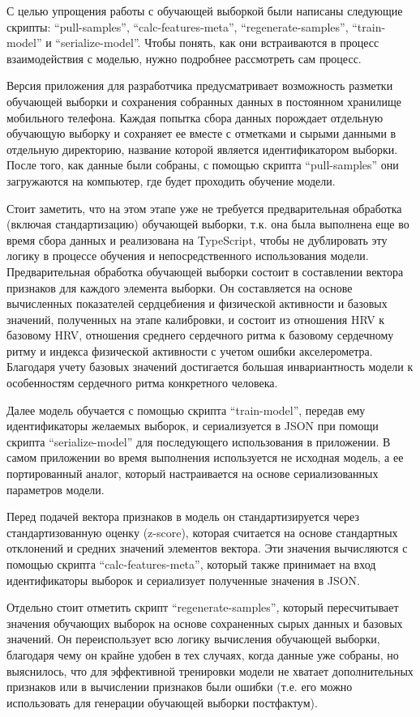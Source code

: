 \documentclass[14pt]{matmex-diploma-custom}
\begin{document}
С целью упрощения работы с обучающей выборкой были написаны следующие скрипты:
``pull-samples'', ``calc-features-meta'', ``regenerate-samples'',
``train-model'' и ``serialize-model''. Чтобы понять, как они встраиваются в
процесс взаимодействия с моделью, нужно подробнее рассмотреть сам процесс.

Версия приложения для разработчика предусматривает возможность разметки
обучающей выборки и сохранения собранных данных в постоянном хранилище
мобильного телефона. Каждая попытка сбора данных порождает отдельную обучающую
выборку и сохраняет ее вместе с отметками и сырыми данными в отдельную
директорию, название которой является идентификатором выборки. После того, как
данные были собраны, с помощью скрипта ``pull-samples'' они загружаются на
компьютер, где будет проходить обучение модели.

Стоит заметить, что на этом этапе уже не требуется предварительная обработка
(включая стандартизацию) обучающей выборки, т.к. она была выполнена еще во время
сбора данных и реализована на TypeScript, чтобы не дублировать эту логику в
процессе обучения и непосредственного использования модели. Предварительная
обработка обучающей выборки состоит в составлении вектора признаков для каждого
элемента выборки. Он составляется на основе вычисленных показателей сердцебиения
и физической активности и базовых значений, полученных на этапе калибровки, и
состоит из отношения HRV к базовому HRV, отношения среднего сердечного ритма к
базовому сердечному ритму и индекса физической активности с учетом ошибки
акселерометра. Благодаря учету базовых значений достигается большая
инвариантность модели к особенностям сердечного ритма конкретного человека.

Далее модель обучается с помощью скрипта ``train-model'', передав ему
идентификаторы желаемых выборок, и сериализуется в JSON при помощи скрипта
``serialize-model'' для последующего использования в приложении. В самом
приложении во время выполнения используется не исходная модель, а ее
портированный аналог, который настраивается на основе сериализованных параметров
модели.

Перед подачей вектора признаков в модель он стандартизируется через
стандартизованную оценку (z-score), которая считается на основе стандартных
отклонений и средних значений элементов вектора. Эти значения вычисляются с
помощью скрипта ``calc-features-meta'', который также принимает на вход
идентификаторы выборок и сериализует полученные значения в JSON.

Отдельно стоит отметить скрипт ``regenerate-samples'', который пересчитывает
значения обучающих выборок на основе сохраненных сырых данных и базовых
значений. Он переиспользует всю логику вычисления обучающей выборки, благодаря
чему он крайне удобен в тех случаях, когда данные уже собраны, но выяснилось,
что для эффективной тренировки модели не хватает дополнительных признаков
или в вычислении признаков были ошибки (т.е. его можно использовать для
генерации обучающей выборки постфактум).
\end{document}
